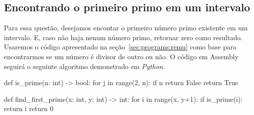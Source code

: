 \documentclass[12pt]{article}
\begin{document}
\subsection{Encontrando o primeiro primo em um intervalo}\label{sec:programs:prime}

Para essa questão, desejamos encontar o primeiro número primo existente em um
intervalo. E, caso não haja nenum número primo, retornar zero como resultado.
Usaremos o código apresentado na seção~\ref{sec:programs:remu} como base para
encontrarmos se um número é divisor de outro ou não. O código em Assembly
seguirá o seguinte algoritmo demonstrado em \emph{Python}.

\begin{python}
def is_prime(n: int) -> bool:
    for j in range(2, n):
        if n%
            return False
    return True

def find_first_prime(x: int, y: int) -> int:
    for i in range(x, y+1):
        if is_prime(i):
            return i
    return 0
\end{python}
\end{document}
